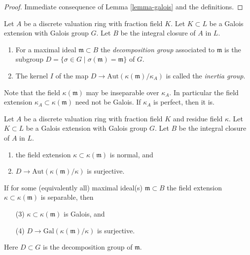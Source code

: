 \begin{proof}
Immediate consequence of Lemma \ref{lemma-galois} and the definitions.
\end{proof}

\begin{definition}
\label{definition-decomposition-inertia}
Let $A$ be a discrete valuation ring with fraction field $K$.
Let $K \subset L$ be a Galois extension with Galois group $G$.
Let $B$ be the integral closure of $A$ in $L$.
\begin{enumerate}
\item For a maximal ideal $\mathfrak m \subset B$ the
{\it decomposition group} associated to $\mathfrak m$ is the subgroup
$D = \{\sigma \in G \mid \sigma(\mathfrak m) = \mathfrak m\}$
of $G$.
\item The kernel $I$ of the map $D \to \text{Aut}(\kappa(\mathfrak m)/\kappa_A)$
is called the {\it inertia group}.
\end{enumerate}
\end{definition}

\noindent
Note that the field $\kappa(\mathfrak m)$ may be inseparable over $\kappa_A$.
In particular the field extension $\kappa_A \subset \kappa(\mathfrak m)$
need not be Galois. If $\kappa_A$ is perfect, then it is.

\begin{lemma}
\label{lemma-galois-galois}
Let $A$ be a discrete valuation ring with fraction field $K$ and residue field
$\kappa$. Let $K \subset L$ be a Galois extension with Galois group $G$.
Let $B$ be the integral closure of $A$ in $L$.
\begin{enumerate}
\item the field extension $\kappa \subset \kappa(\mathfrak m)$ is normal, and
\item $D \to \text{Aut}(\kappa(\mathfrak m)/\kappa)$ is surjective.
\end{enumerate}
If for some (equivalently all) maximal ideal(s) $\mathfrak m \subset B$
the field extension $\kappa \subset \kappa(\mathfrak m)$ is separable, then
\begin{enumerate}
\item[(3)] $\kappa \subset \kappa(\mathfrak m)$ is Galois, and
\item[(4)] $D \to \text{Gal}(\kappa(\mathfrak m)/\kappa)$ is surjective.
\end{enumerate}
Here $D \subset G$ is the decomposition group of $\mathfrak m$.
\end{lemma}

